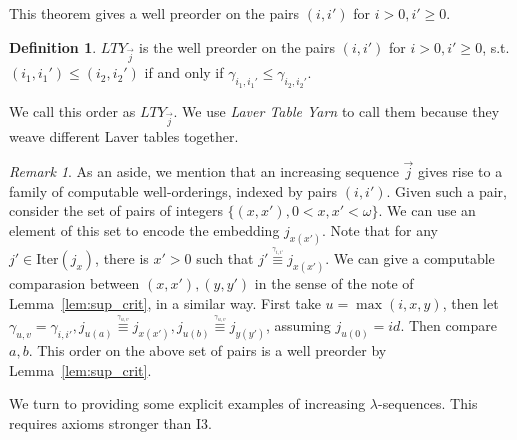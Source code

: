 \documentclass{article}
\newtheorem{theorem}[lemma]{Theorem}
\theoremstyle{definition}
\newtheorem{definition}[lemma]{Definition}
\theoremstyle{remark}
\newtheorem{remark}[lemma]{Remark}
\begin{document}
This theorem gives a well preorder on the pairs $(i,i')$ for $i>0,i'\ge 0$. 
\begin{definition}
  $LTY_{\vec{j}}$ is the well preorder on the pairs $(i,i')$ for $i>0,i'\ge 0$, s.t. $(i_1,i_1')\le (i_2,i_2')$ if and only if $\gamma_{i_1,i_1'}\le \gamma_{i_2,i_2'}$.
\end{definition}
We call this order as $LTY_{\vec{j}}$. We use \textit{Laver Table Yarn} to call them because they weave different Laver tables together.

\begin{remark} \label{lty'}
  As an aside, we mention that an increasing sequence $\vec{j}$ gives rise to a family of computable well-orderings, indexed by pairs $(i,i')$. Given such a pair, consider the set of pairs of integers $\{(x,x'),0<x,x'<\omega\}$. We can use an element of this set to encode the embedding $j_{x(x')}$. Note that for any $j'\in \mathrm{Iter}(j_x)$, there is $x'>0$ such that $j'\overset{\underset{\gamma_{i,i'}}{}}{\equiv}j_{x(x')}$. We can give a computable comparasion between $(x,x'),(y,y')$ in the sense of the note of Lemma~\ref{lem:sup_crit}, in a similar way. First take $u=\max(i,x,y)$, then let $\gamma_{u,v}=\gamma_{i,i'}, j_{u(a)}\overset{\underset{\gamma_{u,v}}{}}{\equiv}j_{x(x')},j_{u(b)}\overset{\underset{\gamma_{u,v}}{}}{\equiv}j_{y(y')}$, assuming $j_{u(0)}=id$. Then compare $a,b$. This order on the above set of pairs is a well preorder by Lemma~\ref{lem:sup_crit}. 
\end{remark}



We turn to providing some explicit examples of increasing $\lambda$-sequences. This requires axioms stronger than I3. 
\end{document}
